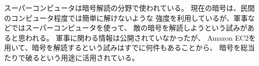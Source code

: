 スーパーコンピュータは暗号解読の分野で使われている。
現在の暗号は、民間のコンピュータ程度では簡単に解けないような
強度を利用しているが、軍事などではスーパーコンピュータを使って、
敵の暗号を解読しようという試みがあると思われる。
軍事に関わる情報は公開されていなかったが、
Amazon EC2を用いて、暗号を解読するという試みはすでに何件もあることから、
暗号を総当たりで破るという用途に活用されている。
